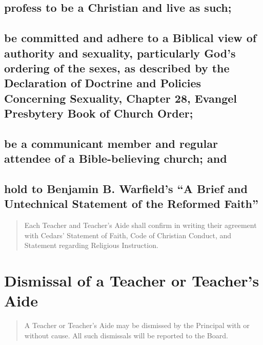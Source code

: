 \documentclass[
]{book}
\begin{document}
\subsection{profess to be a Christian and live as such;}\label{profess-to-be-a-christian-and-live-as-such}

\subsection{be committed and adhere to a Biblical view of authority and sexuality, particularly God's ordering of the sexes, as described by the Declaration of Doctrine and Policies Concerning Sexuality, Chapter 28, Evangel Presbytery Book of Church Order;}\label{be-committed-and-adhere-to-a-biblical-view-of-authority-and-sexuality-particularly-gods-ordering-of-the-sexes-as-described-by-the-declaration-of-doctrine-and-policies-concerning-sexuality-chapter-28-evangel-presbytery-book-of-church-order}

\subsection{be a communicant member and regular attendee of a Bible-believing church; and}\label{be-a-communicant-member-and-regular-attendee-of-a-bible-believing-church-and}

\subsection{hold to Benjamin B. Warfield's ``A Brief and Untechnical Statement of the Reformed Faith''}\label{hold-to-benjamin-b.-warfields-a-brief-and-untechnical-statement-of-the-reformed-faith}

\begin{quote}
Each Teacher and Teacher's Aide shall confirm in writing their
agreement with Cedars' Statement of Faith, Code of Christian Conduct,
and Statement regarding Religious Instruction.
\end{quote}

\section{Dismissal of a Teacher or Teacher's Aide}\label{dismissal-of-a-teacher-or-teachers-aide}

\begin{quote}
A Teacher or Teacher's Aide may be dismissed by the Principal with or
without cause. All such dismissals will be reported to the Board.
\end{quote}
\end{document}
